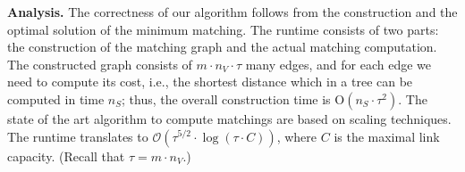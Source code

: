 \documentclass[9pt]{sigcomm-alternate}
\newcommand{\maciek}[1]{\textcolor{brown}{maciek: #1}}
\newcommand{\MaFactor}{m}
\newcommand{\ChunkType}{\tau}
\begin{document}
\textbf{Analysis.}
The correctness of our algorithm follows from the construction and the optimal
solution of the minimum matching.
The runtime consists of two parts: the construction of the matching graph and
the actual matching computation. The constructed graph consists of
$\MaFactor \cdot n_V \cdot \ChunkType$ many edges,
and for each edge we need to compute its cost, i.e., the shortest distance
which in a tree can be computed in time $n_S$; thus, the overall construction time
is 
$\mathrm{O}(n_S \cdot \tau^2)$.
The state of the art algorithm to compute matchings are based on scaling techniques.~\cite{scale-match}
The runtime translates to
$\mathcal{O}(\tau^{5/2}\cdot \log(\tau\cdot C))$,
where $C$ is the maximal link capacity. 
(Recall that $\tau = \MaFactor\cdot n_V$.)

\end{document}
